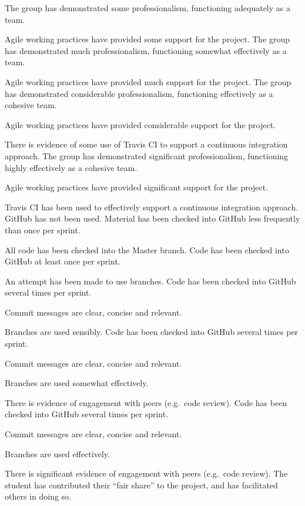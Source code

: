 \documentclass{../fal_assignment}
\begin{document}
\begin{markingrubric}
        \grade The group has demonstrated some professionalism,
            functioning adequately as a team.
            \par Agile working practices have provided some support for the project.
        \grade The group has demonstrated much professionalism,
            functioning somewhat effectively as a team.
            \par Agile working practices have provided much support for the project.
        \grade The group has demonstrated considerable professionalism,
            functioning effectively as a cohesive team.
            \par Agile working practices have provided considerable support for the project.
            \par There is evidence of some use of Travis CI to support a continuous integration approach.
        \grade The group has demonstrated significant professionalism,
            functioning highly effectively as a cohesive team.
            \par Agile working practices have provided significant support for the project.
            \par Travis CI has been used to effectively support a continuous integration approach.
%
        \grade\fail GitHub has not been used.
        \grade Material has been checked into GitHub less frequently than once per sprint.
            \par All code has been checked into the Master branch.
        \grade Code has been checked into GitHub at least once per sprint.
            \par An attempt has been made to use branches.
        \grade Code has been checked into GitHub several times per sprint.
            \par Commit messages are clear, concise and relevant.
            \par Branches are used sensibly.
        \grade Code has been checked into GitHub several times per sprint.
            \par Commit messages are clear, concise and relevant.
            \par Branches are used somewhat effectively.
            \par There is evidence of engagement with peers (e.g.\ code review).
        \grade Code has been checked into GitHub several times per sprint.
            \par Commit messages are clear, concise and relevant.
            \par Branches are used effectively.
            \par There is significant evidence of engagement with peers (e.g.\ code review).
%
        \grade The student has contributed their ``fair share'' to the project,
            and has facilitated others in doing so.
\end{markingrubric}
\end{document}
